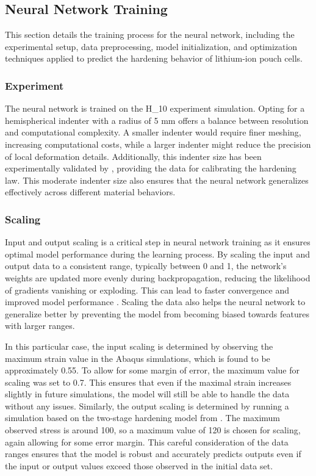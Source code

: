 \subsection{Neural Network Training}
This section details the training process for the neural network, including the experimental setup, data preprocessing, model initialization, and optimization techniques applied to predict the hardening behavior of lithium-ion pouch cells.

\subsubsection{Experiment}
The neural network is trained on the H\_10 experiment simulation. Opting for a hemispherical indenter with a radius of 5 mm offers a balance between resolution and computational complexity. A smaller indenter would require finer meshing, increasing computational costs, while a larger indenter might reduce the precision of local deformation details. Additionally, this indenter size has been experimentally validated by \citet{Tancogne-Ind}, providing the data for calibrating the hardening law. This moderate indenter size also ensures that the neural network generalizes effectively across different material behaviors.


\subsubsection{Scaling}

Input and output scaling is a critical step in neural network training as it ensures optimal model performance during the learning process. By scaling the input and output data to a consistent range, typically between 0 and 1, the network's weights are updated more evenly during backpropagation, reducing the likelihood of gradients vanishing or exploding. This can lead to faster convergence and improved model performance \citep[p.~8]{bishop2006pattern}. Scaling the data also helps the neural network to generalize better by preventing the model from becoming biased towards features with larger ranges.

In this particular case, the input scaling is determined by observing the maximum strain value in the Abaqus simulations, which is found to be approximately 0.55. To allow for some margin of error, the maximum value for scaling was set to 0.7. This ensures that even if the maximal strain increases slightly in future simulations, the model will still be able to handle the data without any issues. Similarly, the output scaling is determined by running a simulation based on the two-stage hardening model from \citep{Tancogne-Ind}. The maximum observed stress is around 100, so a maximum value of 120 is chosen for scaling, again allowing for some error margin. This careful consideration of the data ranges ensures that the model is robust and accurately predicts outputs even if the input or output values exceed those observed in the initial data set.


